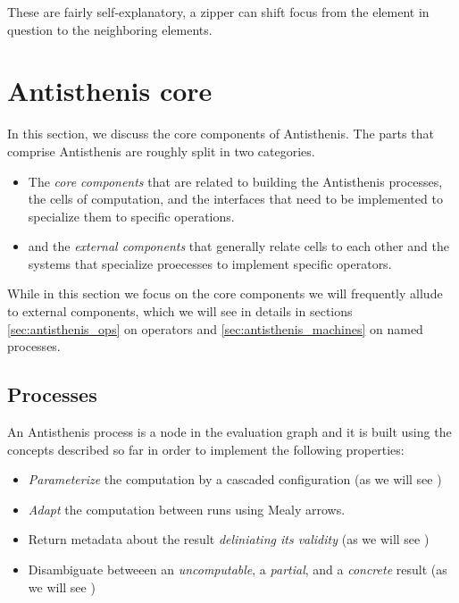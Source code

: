 These are fairly self-explanatory, a zipper can shift focus from the
element in question to the neighboring elements.

\section{Antisthenis core}

In this section, we discuss the core components of Antisthenis. The
parts that comprise Antisthenis are roughly split in two
categories.

\begin{itemize}
\item The \emph{core components} that are related to building the
  Antisthenis processes, the cells of computation, and the interfaces
  that need to be implemented to specialize them to specific
  operations.
\item and the \emph{external components} that generally relate cells
  to each other and the systems that specialize proecesses to
  implement specific operators.
\end{itemize}

While in this section we focus on the core components we will
frequently allude to external components, which we will see in details
in sections \ref{sec:antisthenis_ops} on operators and
\ref{sec:antisthenis_machines} on named processes.

\subsection{Processes}
\label{sec:antisthenis_processes}

An Antisthenis process is a node in the evaluation graph and it is
built using the concepts described so far in order to implement the
following properties:

\begin{itemize}
\item \emph{Parameterize} the computation by a cascaded configuration
  (as we will see )
\item \emph{Adapt} the computation between runs using Mealy arrows.
\item Return metadata about the result \emph{deliniating its validity}
  (as we will see )
\item Disambiguate betweeen an \emph{uncomputable}, a \emph{partial},
  and a \emph{concrete} result (as we will see )
\end{itemize}

